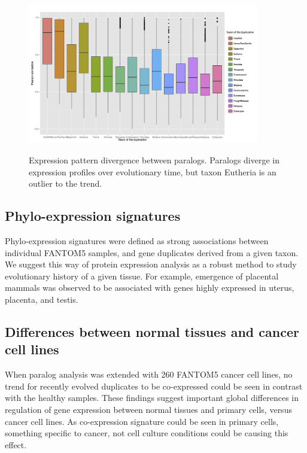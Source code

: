 \documentclass[11pt, a4paper,oneside]{report}
\begin{document}
\begin{figure}[t]
\begin{center}
\label{img:populations}
\includegraphics[width=0.9\textwidth]{figures/fantom_eutheria.png}
\end{center}
\caption{Expression pattern divergence between paralogs.
Paralogs diverge in expression profiles over evolutionary time, but taxon Eutheria is an outlier to the trend.} 
\end{figure}

\subsection{Phylo-expression signatures}
Phylo-expression signatures were defined as strong associations between individual FANTOM5 samples, and gene duplicates derived from a given taxon. We suggest this way of protein expression analysis as a robust method to study evolutionary history of a given tissue. For example, emergence of placental mammals was observed to be associated with genes highly expressed in uterus, placenta, and testis.

\subsection{Differences between normal tissues and cancer cell lines}
When paralog analysis was extended with 260 FANTOM5 cancer cell lines, no trend for recently evolved duplicates to be co-expressed could be seen in contrast with the healthy samples. These findings suggest important global differences in regulation of gene expression between normal tissues and primary cells, versus cancer cell lines. As co-expression signature could be seen in primary cells, something specific to cancer, not cell culture conditions could be causing this effect.
\end{document}
